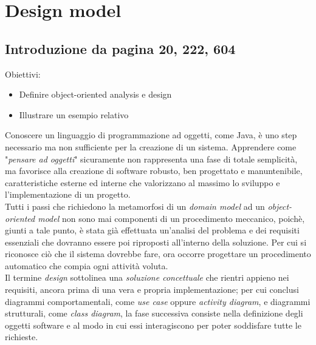 \documentclass{article}
\begin{document}
\pagestyle{empty}
\section*{Design model}
\large

\subsection*{Introduzione da pagina 20, 222, 604}
\large
Obiettivi:
\begin{itemize}
    \renewcommand{\labelitemi}{-}
    \itemsep0em
    \item Definire object-oriented analysis e design
    \item Illustrare un esempio relativo
\end{itemize}
Conoscere un linguaggio di programmazione ad oggetti, come Java, è uno step necessario ma non sufficiente per la creazione di un sistema. Apprendere come "\textit{pensare ad oggetti}" sicuramente non rappresenta una fase di totale semplicità, ma favorisce alla creazione di software robusto, ben progettato e manuntenibile, caratteristiche esterne ed interne che valorizzano al massimo lo sviluppo e l'implementazione di un progetto.\vspace*{14pt}\\
Tutti i passi che richiedono la metamorfosi di un \textit{domain model} ad un \textit{object-oriented model} non sono mai componenti di un procedimento meccanico, poichè, giunti a tale punto, è stata già effettuata un'analisi del problema e dei requisiti essenziali che dovranno essere poi riproposti all'interno della soluzione. Per cui si riconosce ciò che il sistema dovrebbe fare, ora occorre progettare un procedimento automatico che compia ogni attività voluta.\vspace*{14pt}\\
Il termine \textit{design} sottolinea una \textit{soluzione concettuale} che rientri appieno nei requisiti, ancora prima di una vera e propria implementazione; per cui conclusi diagrammi comportamentali, come \textit{use case} oppure \textit{activity diagram}, e diagrammi strutturali, come \textit{class diagram}, la fase successiva consiste nella definizione degli oggetti software e al modo in cui essi interagiscono per poter soddisfare tutte le richieste.
\end{document}
